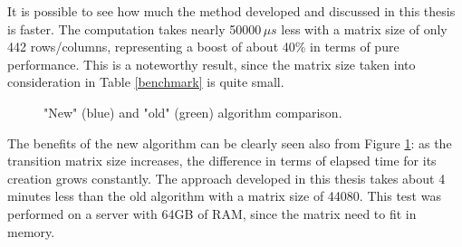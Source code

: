 It is possible to see how much the method developed and discussed in this thesis is faster. The computation takes nearly 50000\(\,\mu{s} \) less with a matrix size of only 442 rows/columns, representing a boost of about 40\% in terms of pure performance. This is a noteworthy result, since the matrix size taken into consideration in Table \ref{benchmark} is quite small.\\

\begin{figure}[H]
  \caption[]{"New" (blue) and "old" (green) algorithm comparison\footnotemark[3].}
  \label{performancechart}
\end{figure}


The benefits of the new algorithm can be clearly seen also from Figure \ref{performancechart}: as the transition matrix size increases, the difference in terms of elapsed time for its creation grows constantly. The approach developed in this thesis takes about 4 minutes less than the old algorithm with a matrix size of 44080. This test was performed on a server with 64GB of RAM, since the matrix need to fit in memory.